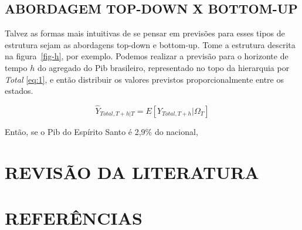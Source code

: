 \documentclass[
  12pt,
  letterpaper,
  DIV=11,
  numbers=noendperiod]{scrartcl}
\begin{document}
\hypertarget{abordagem-top-down-x-bottom-up}{%
\subsection*{ABORDAGEM TOP-DOWN X
BOTTOM-UP}\label{abordagem-top-down-x-bottom-up}}

Talvez as formas mais intuitivas de se pensar em previsões para esses
tipos de estrutura sejam as abordagens top-down e bottom-up. Tome a
estrutura descrita na figura~\ref{fig-h}, por exemplo. Podemos realizar
a previsão para o horizonte de tempo \(h\) do agregado do Pib
brasileiro, representado no topo da hierarquia por \emph{Total}
\eqref{eq:1}, e então distribuir os valores previstos proporcionalmente
entre os estados.

\begin{equation}
\hat{Y}_{Total, T+h | T} = E[Y_{Total, T+h} | \Omega_T] \label{eq:1}
\end{equation}

Então, se o Pib do Espírito Santo é 2,9\% do nacional,

\hypertarget{revisuxe3o-da-literatura}{%
\section{REVISÃO DA LITERATURA}\label{revisuxe3o-da-literatura}}

\newpage

\hypertarget{referuxeancias}{%
\section*{REFERÊNCIAS}\label{referuxeancias}}


\end{document}
